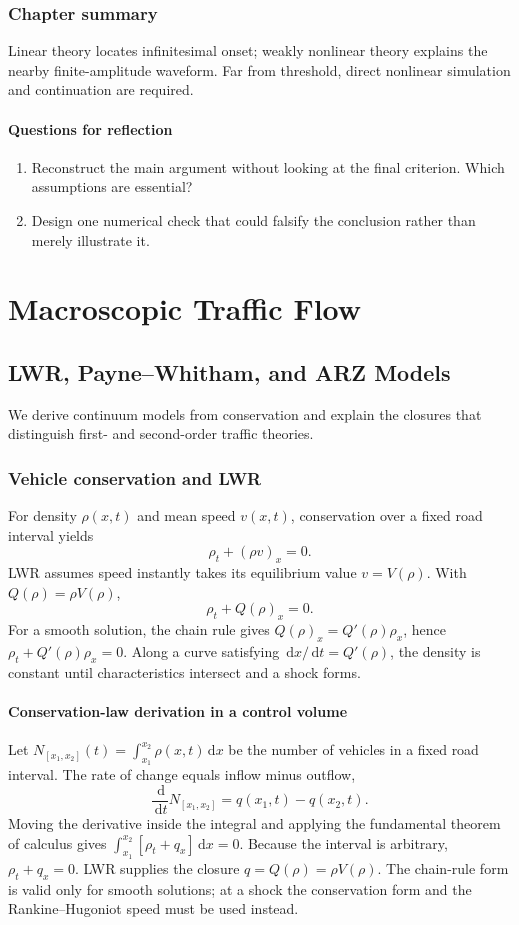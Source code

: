 \documentclass[11pt,a4paper,openany]{book}
\numberwithin{equation}{chapter}
\numberwithin{figure}{chapter}
\numberwithin{table}{chapter}
\newcommand{\chapterguide}[1]{\begin{tcolorbox}[keybox,title=Chapter guide]#1\end{tcolorbox}}
\newcommand{\chapterend}[1]{\section*{Chapter summary}\addcontentsline{toc}{section}{Chapter summary}\begin{tcolorbox}[resultbox]#1\end{tcolorbox}\subsection*{Questions for reflection}\begin{enumerate}[leftmargin=1.7em]\item Reconstruct the main argument without looking at the final criterion. Which assumptions are essential?\item Design one numerical check that could falsify the conclusion rather than merely illustrate it.\end{enumerate}\clearpage}
\newcommand{\dd}{\,\mathrm{d}}
\begin{document}
\chapterend{Linear theory locates infinitesimal onset; weakly nonlinear theory explains the nearby finite-amplitude waveform. Far from threshold, direct nonlinear simulation and continuation are required.}

\part{Macroscopic Traffic Flow}

\chapter{LWR, Payne--Whitham, and ARZ Models}
\chapterguide{We derive continuum models from conservation and explain the closures that distinguish first- and second-order traffic theories.}

\section{Vehicle conservation and LWR}
For density $\rho(x,t)$ and mean speed $v(x,t)$, conservation over a fixed road interval yields \cite{lwr1955,richards1956}
\begin{equation}
\rho_t+(\rho v)_x=0.
\end{equation}
LWR assumes speed instantly takes its equilibrium value $v=V(\rho)$. With $Q(\rho)=\rho V(\rho)$,
\begin{equation}
\rho_t+Q(\rho)_x=0.
\end{equation}
For a smooth solution, the chain rule gives $Q(\rho)_x=Q'(\rho)\rho_x$, hence $\rho_t+Q'(\rho)\rho_x=0$. Along a curve satisfying $\dd x/\dd t=Q'(\rho)$, the density is constant until characteristics intersect and a shock forms.

\subsection{Conservation-law derivation in a control volume}
Let $N_{[x_1,x_2]}(t)=\int_{x_1}^{x_2}\rho(x,t)\dd x$ be the number of vehicles in a fixed road interval. The rate of change equals inflow minus outflow,
\begin{equation}
\frac{\dd}{\dd t}N_{[x_1,x_2]}=q(x_1,t)-q(x_2,t).
\end{equation}
Moving the derivative inside the integral and applying the fundamental theorem of calculus gives $\int_{x_1}^{x_2}[\rho_t+q_x]\dd x=0$. Because the interval is arbitrary, $\rho_t+q_x=0$. LWR supplies the closure $q=Q(\rho)=\rho V(\rho)$. The chain-rule form is valid only for smooth solutions; at a shock the conservation form and the Rankine--Hugoniot speed must be used instead.
\end{document}
